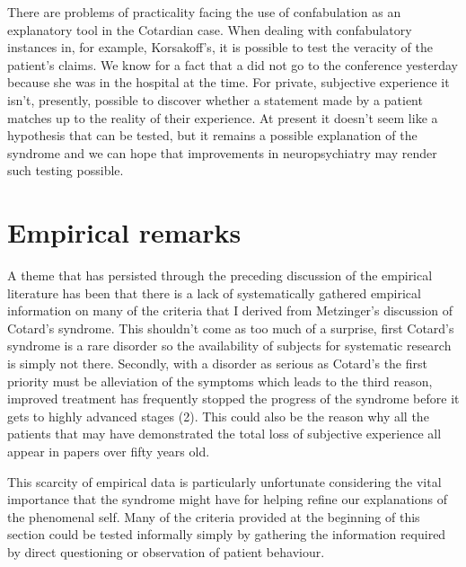 There are problems of practicality facing the use of confabulation as an explanatory tool in the Cotardian case. When dealing with confabulatory instances in, for example, Korsakoff's, it is possible to test the veracity of the patient's claims. We know for a fact that a did not go to the conference yesterday because she was in the hospital at the time. For private, subjective experience it isn't, presently, possible to discover whether a statement made by a patient matches up to the reality of their experience. At present it doesn't seem like a hypothesis that can be tested, but it remains a possible explanation of the syndrome and we can hope that improvements in neuropsychiatry may render such testing possible.

\section{Empirical remarks}

A theme that has persisted through the preceding discussion of the empirical literature has been that there is a lack of systematically gathered empirical information on many of the criteria that I derived from Metzinger's discussion of Cotard's syndrome. This shouldn't come as too much of a surprise, first Cotard's syndrome is a rare disorder so the availability of subjects for systematic research is simply not there. Secondly, with a disorder as serious as Cotard's the first priority must be alleviation of the symptoms which leads to the third reason, improved treatment has frequently stopped the progress of the syndrome before it gets to highly advanced stages (2). This could also be the reason why all the patients that may have demonstrated the total loss of subjective experience all appear in papers over fifty years old.

This scarcity of empirical data is particularly unfortunate considering the vital importance that the syndrome might have for helping refine our explanations of the phenomenal self. Many of the criteria provided at the beginning of this section could be tested informally simply by gathering the information required by direct questioning or observation of patient behaviour. 

